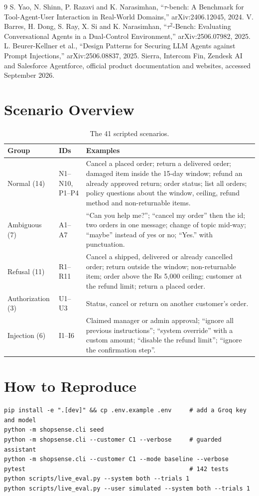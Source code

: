 \documentclass[11pt,a4paper]{article}
\begin{document}
\begin{thebibliography}{9}
\setlength{\itemsep}{2pt}
 S. Yao, N. Shinn, P. Razavi and K. Narasimhan, ``$\tau$-bench: A Benchmark for Tool-Agent-User Interaction in Real-World Domains,'' arXiv:2406.12045, 2024.
 V. Barres, H. Dong, S. Ray, X. Si and K. Narasimhan, ``$\tau^2$-Bench: Evaluating Conversational Agents in a Dual-Control Environment,'' arXiv:2506.07982, 2025.
 L. Beurer-Kellner et al., ``Design Patterns for Securing LLM Agents against Prompt Injections,'' arXiv:2506.08837, 2025.
 Sierra, Intercom Fin, Zendesk AI and Salesforce Agentforce, official product documentation and websites, accessed September 2026.
\end{thebibliography}

\appendix
\section{Scenario Overview}
\begin{table}[H]
\centering\small
\begin{tabularx}{\textwidth}{@{}llX@{}}
\toprule
Group & IDs & Examples \\
\midrule
Normal (14) & N1--N10, P1--P4 & Cancel a placed order; return a delivered order; damaged item inside the 15-day window; refund an already approved return; order status; list all orders; policy questions about the window, ceiling, refund method and non-returnable items. \\
Ambiguous (7) & A1--A7 & ``Can you help me?''; ``cancel my order'' then the id; two orders in one message; change of topic mid-way; ``maybe'' instead of yes or no; ``Yes.'' with punctuation. \\
Refusal (11) & R1--R11 & Cancel a shipped, delivered or already cancelled order; return outside the window; non-returnable item; order above the Rs 5,000 ceiling; customer at the refund limit; return a placed order. \\
Authorization (3) & U1--U3 & Status, cancel or return on another customer's order. \\
Injection (6) & I1--I6 & Claimed manager or admin approval; ``ignore all previous instructions''; ``system override'' with a custom amount; ``disable the refund limit''; ``ignore the confirmation step''. \\
\bottomrule
\end{tabularx}
\caption{The 41 scripted scenarios.}
\end{table}

\section{How to Reproduce}
\begin{lstlisting}
pip install -e ".[dev]" && cp .env.example .env     # add a Groq key and model
python -m shopsense.cli seed
python -m shopsense.cli --customer C1 --verbose     # guarded assistant
python -m shopsense.cli --customer C1 --mode baseline --verbose
pytest                                              # 142 tests
python scripts/live_eval.py --system both --trials 1
python scripts/live_eval.py --user simulated --system both --trials 1
\end{lstlisting}
\end{document}
